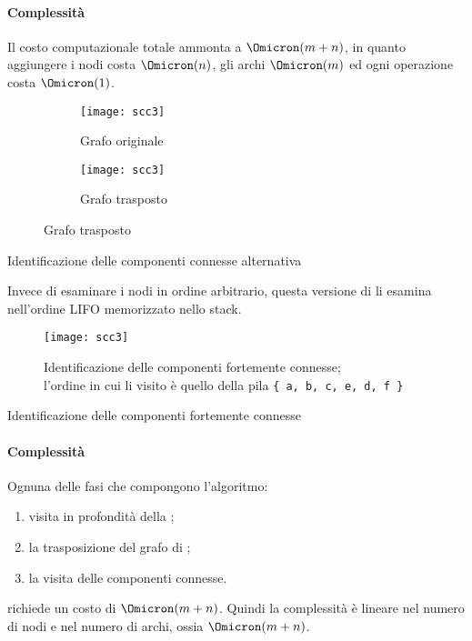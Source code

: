\clearpage
\paragraph{Complessità}
Il costo computazionale totale ammonta a \(\Omicron(m+n)\), in quanto aggiungere i nodi costa \(\Omicron(n)\), gli archi \(\Omicron(m)\) ed ogni operazione costa \(\Omicron(1)\).

\begin{figure}[H]
	\begin{subfigure}{.5\textwidth}
		\texttt{[image: scc3]}
		\caption{Grafo originale}
	\end{subfigure}\hfill
	\begin{subfigure}{.5\textwidth}
		\texttt{[image: scc3]}
		\caption{Grafo trasposto}
	\end{subfigure}
\end{figure}

\begin{algorithm}[H]
	\caption{Identificazione delle componenti connesse alternativa}
	
	
\end{algorithm}

Invece di esaminare i nodi in ordine arbitrario, questa versione di \ConnectedComponents li esamina nell'ordine \textsc{LIFO} memorizzato nello stack.

\begin{figure}[H]\centering
	\texttt{[image: scc3]}
	\caption[Identificazione delle componenti fortemente connesse]{Identificazione delle componenti fortemente connesse;\\l'ordine in cui li visito è quello della pila \texttt{\{ a, b, c, e, d, f \} }}
\end{figure}

\begin{algorithm}[H]
	\caption{Identificazione delle componenti fortemente connesse}
	
\end{algorithm}

\paragraph{Complessità}
Ognuna delle fasi che compongono l'algoritmo:
\begin{enumerate}
	\item visita in profondità della \topSort;
	\item la trasposizione del grafo di \transpose;
	\item la visita delle componenti connesse.
\end{enumerate}
richiede un costo di \(\Omicron(m+n)\).
Quindi la complessità è lineare nel numero di nodi e nel numero di archi, ossia \(\Omicron(m+n)\).

